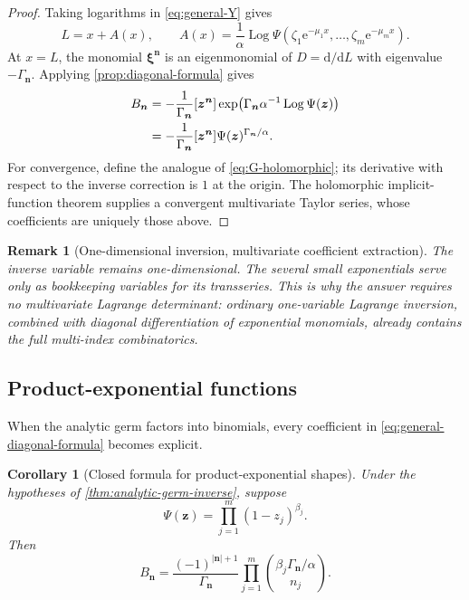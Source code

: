 \documentclass[11pt,oneside]{article}
\numberwithin{equation}{section}
\newtheorem{corollary}[theorem]{Corollary}
\newtheorem{remark}[theorem]{Remark}
\newcommand{\Log}{\operatorname{Log}}
\newcommand{\e}{\mathrm{e}}
\newcommand{\dd}{\mathrm{d}}
\newcommand{\vct}[1]{\boldsymbol{#1}}
\newcommand{\coeff}[2]{[#1]#2}
\begin{document}
\begin{proof}
Taking logarithms in \cref{eq:general-Y} gives
\begin{equation}
  L=x+A(x),
  \qquad
  A(x)=\frac1\alpha\Log\Psi\!\left(
  \zeta_1\e^{-\mu_1x},\ldots,\zeta_m\e^{-\mu_mx}\right).
  \label{eq:general-A}
\end{equation}
At \(x=L\), the monomial \(\vct\xi^{\vct n}\) is an eigenmonomial of
\(D=\dd/\dd L\) with eigenvalue \(-\Gamma_{\vct n}\).  Applying
\cref{prop:diagonal-formula} gives
\begin{align}
 B_{\vct n}
 &=-\frac1{\Gamma_{\vct n}}
   \coeff{\vct z^{\vct n}}
   {\exp\!\left(\Gamma_{\vct n}\alpha^{-1}\Log\Psi(\vct z)\right)}
 \notag\\
 &=-\frac1{\Gamma_{\vct n}}
   \coeff{\vct z^{\vct n}}
   {\Psi(\vct z)^{\Gamma_{\vct n}/\alpha}}.
\end{align}
For convergence, define the analogue of \cref{eq:G-holomorphic}; its derivative
with respect to the inverse correction is \(1\) at the origin.  The
holomorphic implicit-function theorem supplies a convergent multivariate Taylor
series, whose coefficients are uniquely those above.
\end{proof}

\begin{remark}[One-dimensional inversion, multivariate coefficient extraction]
The inverse variable remains one-dimensional.  The several small exponentials
serve only as bookkeeping variables for its transseries.  This is why the
answer requires no multivariate Lagrange determinant: ordinary one-variable
Lagrange inversion, combined with diagonal differentiation of exponential
monomials, already contains the full multi-index combinatorics.
\end{remark}

\subsection{Product-exponential functions}

When the analytic germ factors into binomials, every coefficient in
\cref{eq:general-diagonal-formula} becomes explicit.

\begin{corollary}[Closed formula for product-exponential shapes]
\label{cor:product-exponential}
Under the hypotheses of \cref{thm:analytic-germ-inverse}, suppose
\begin{equation}
  \Psi(\vct z)=\prod_{j=1}^m(1-z_j)^{\beta_j}.
  \label{eq:Psi-product}
\end{equation}
Then
\begin{equation}
  \boxed{
  B_{\vct n}
  =\frac{(-1)^{|\vct n|+1}}{\Gamma_{\vct n}}
   \prod_{j=1}^m
   \binom{\beta_j\Gamma_{\vct n}/\alpha}{n_j}.
  }
  \label{eq:product-coefficients}
\end{equation}
\end{corollary}
\end{document}
